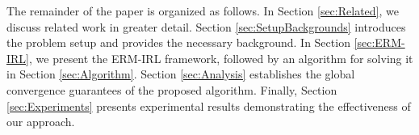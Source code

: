 The remainder of the paper is organized as follows. In Section \ref{sec:Related}, we discuss related work in greater detail. Section \ref{sec:SetupBackgrounds} introduces the problem setup and provides the necessary background. In Section \ref{sec:ERM-IRL}, we present the ERM-IRL framework, followed by an algorithm for solving it in Section \ref{sec:Algorithm}. Section \ref{sec:Analysis} establishes the global convergence guarantees of the proposed algorithm. Finally, Section \ref{sec:Experiments} presents experimental results demonstrating the effectiveness of our approach.
